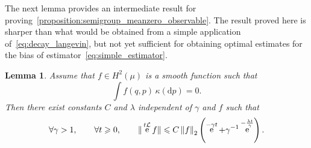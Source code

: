 \documentclass[11pt,a4paper]{article}
\DeclareMathOperator{\e}{e}
\renewcommand{\d}{\mathrm d}
\theoremstyle{plain}
\newtheorem{lemma}{Lemma}[section]
\numberwithin{equation}{section}
\renewcommand{\leq}{\leqslant}
\renewcommand{\geq}{\geqslant}
\begin{document}
The next lemma provides an intermediate result for proving~\cref{proposition:semigroup_meanzero_observable}.
The result proved here is sharper than what would be obtained from a simple application of~\eqref{eq:decay_langevin},
but not yet sufficient for obtaining optimal estimates for the bias of estimator~\eqref{eq:simple_estimator}.
\begin{lemma}
    \label{lemma:initial_lemma}
    Assume that $f \in H^2(\mu)$ is a smooth function such that
    \begin{equation}
        \label{eq:assumption_f}
        \int f(q, p) \, \kappa(\d p) = 0.
    \end{equation}
    Then there exist constants $C$ and $\lambda$ independent of $\gamma$ and $f$ such that
    \[
        \forall \gamma > 1, \qquad
        \forall t \geq 0, \qquad
        \norm*{\e^{t\mathcal L} f}
        \leq C \norm{f}[2]
        \left( \e^{- \gamma t} + \gamma^{-1} \e^{-\frac{\lambda t}{\gamma}} \right).
    \]
\end{lemma}
\end{document}
